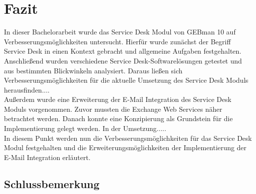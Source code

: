 \section{Fazit}

\noindent
In dieser Bachelorarbeit wurde das Service Desk Modul von GEBman 10 auf Verbesserungsmöglichkeiten untersucht. Hierfür wurde zunächst der Begriff Service Desk in einen Kontext gebracht und allgemeine Aufgaben festgehalten. Anschließend wurden verschiedene Service Desk-Softwarelösungen getestet und aus bestimmten Blickwinkeln analysiert. Daraus ließen sich Verbesserungsmöglichkeiten für die aktuelle Umsetzung des Service Desk Moduls herausfinden....\\ 

\noindent
Außerdem wurde eine Erweiterung der E-Mail Integration des Service Desk Moduls vorgenommen. Zuvor mussten die Exchange Web Services näher betrachtet werden. Danach konnte eine Konzipierung als Grundstein für die Implementierung gelegt werden. In der Umsetzung.....\\

\noindent
In diesem Punkt werden nun die Verbesserungsmöglichkeiten für das Service Desk Modul festgehalten und die Erweiterungsmöglichkeiten der Implementierung der E-Mail Integration erläutert.

\subsection{Schlussbemerkung}